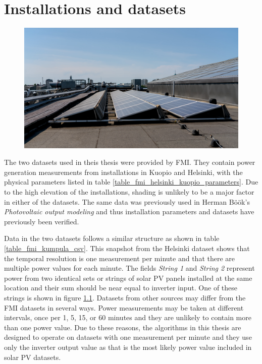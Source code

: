 \chapter{Installations and datasets}

\begin{figure}[h]
\centering
\includegraphics[width=0.8\linewidth]{pics/fmikumpula}
\label{fig_fmikumpula_panels}
\end{figure}


\noindent The two datasets used in theis thesis were provided by FMI. They contain power generation measurements from installations in Kuopio and Helsinki, with the physical parameters listed in table \ref{table_fmi_helsinki_kuopio_parameters}. Due to the high elevation of the installations, shading is unlikely to be a major factor in either of the datasets. The same data was previously used in Herman Böök's \textit{Photovoltaic output modeling}\cite{hbook1} and thus installation parameters and datasets have previously been verified.

Data in the two datasets follows a similar structure as shown in table \ref{table_fmi_kumpula_csv}. This snapshot from the Helsinki dataset shows that the temporal resolution is one measurement per minute and that there are multiple power values for each minute. The fields \textit{String 1} and \textit{String 2} represent power from two identical sets or strings of solar PV panels installed at the same location and their sum should be near equal to inverter input. One of these strings is shown in figure \ref{fig_fmikumpula_panels}. Datasets from other sources may differ from the FMI datasets in several ways. Power measurements may be taken at different intervals, once per 1, 5, 15, or 60 minutes and they are unlikely to contain more than one power value. Due to these reasons, the algorithms in this thesis are designed to operate on datasets with one measurement per minute and they use only the inverter output value as that is the most likely power value included in solar PV datasets.



